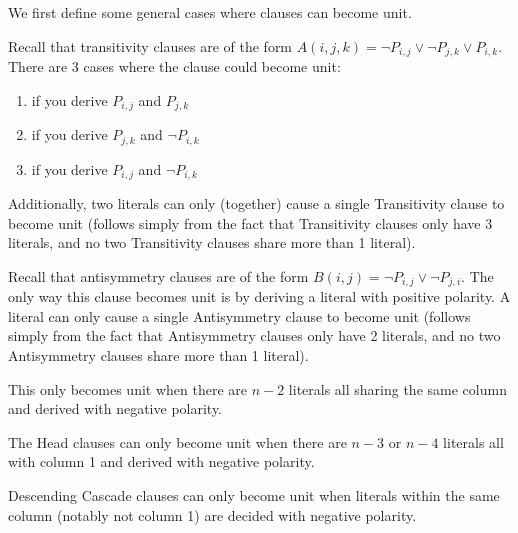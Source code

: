 \documentclass[a4paper,UKenglish,cleveref, autoref, thm-restate]{lipics-v2021}
\begin{document}
We first define some general cases where clauses can become unit. 
\begin{observation}
Recall that transitivity clauses are of the form $A(i, j, k) = \neg P_{i, j} \lor \neg P_{j, k} \lor P_{i, k}$. There are 3 cases where the clause could become unit: 
\begin{enumerate}
    \item if you derive $P_{i, j}$ and $P_{j, k}$
    \item if you derive $P_{j, k}$ and $\neg P_{i, k}$
    \item if you derive $P_{i, j}$ and $\neg P_{i, k}$
\end{enumerate}

Additionally, two literals can only (together) cause a single Transitivity clause to become unit (follows simply from the fact that Transitivity clauses only have 3 literals, and no two Transitivity clauses share more than 1 literal). 
\end{observation}

\begin{observation} 
Recall that antisymmetry clauses are of the form $B(i, j) = \neg P_{i, j} \lor \neg P_{j, i}$. The only way this clause becomes unit is by deriving a literal with positive polarity. A literal can only cause a single Antisymmetry clause to become unit (follows simply from the fact that Antisymmetry clauses only have 2 literals, and no two Antisymmetry clauses share more than 1 literal). 
\end{observation}

\begin{observation} 
This only becomes unit when there are $n - 2$ literals all sharing the same column and derived with negative polarity.
\end{observation}

\begin{observation} 
The Head clauses can only become unit when there are $n - 3$ or $n - 4$ literals all with column 1 and derived with negative polarity.
\end{observation}

\begin{observation} 
Descending Cascade clauses can only become unit when literals within the same column (notably not column 1) are decided with negative polarity.
\end{observation}
\end{document}
